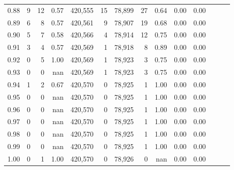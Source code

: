 \begin{tabular}{rrrrrrrrrrrrrr}
0.88 &       9 &     12 &  0.57 &  420,555 &       15 &  78,899 &      27 &  0.64 &  0.00 &      0.00 \\
0.89 &       6 &      8 &  0.57 &  420,561 &        9 &  78,907 &      19 &  0.68 &  0.00 &      0.00 \\
0.90 &       5 &      7 &  0.58 &  420,566 &        4 &  78,914 &      12 &  0.75 &  0.00 &      0.00 \\
0.91 &       3 &      4 &  0.57 &  420,569 &        1 &  78,918 &       8 &  0.89 &  0.00 &      0.00 \\
0.92 &       0 &      5 &  1.00 &  420,569 &        1 &  78,923 &       3 &  0.75 &  0.00 &      0.00 \\
0.93 &       0 &      0 &   nan &  420,569 &        1 &  78,923 &       3 &  0.75 &  0.00 &      0.00 \\
0.94 &       1 &      2 &  0.67 &  420,570 &        0 &  78,925 &       1 &  1.00 &  0.00 &      0.00 \\
0.95 &       0 &      0 &   nan &  420,570 &        0 &  78,925 &       1 &  1.00 &  0.00 &      0.00 \\
0.96 &       0 &      0 &   nan &  420,570 &        0 &  78,925 &       1 &  1.00 &  0.00 &      0.00 \\
0.97 &       0 &      0 &   nan &  420,570 &        0 &  78,925 &       1 &  1.00 &  0.00 &      0.00 \\
0.98 &       0 &      0 &   nan &  420,570 &        0 &  78,925 &       1 &  1.00 &  0.00 &      0.00 \\
0.99 &       0 &      0 &   nan &  420,570 &        0 &  78,925 &       1 &  1.00 &  0.00 &      0.00 \\
1.00 &       0 &      1 &  1.00 &  420,570 &        0 &  78,926 &       0 &   nan &  0.00 &      0.00 \\
\bottomrule
\end{tabular}
